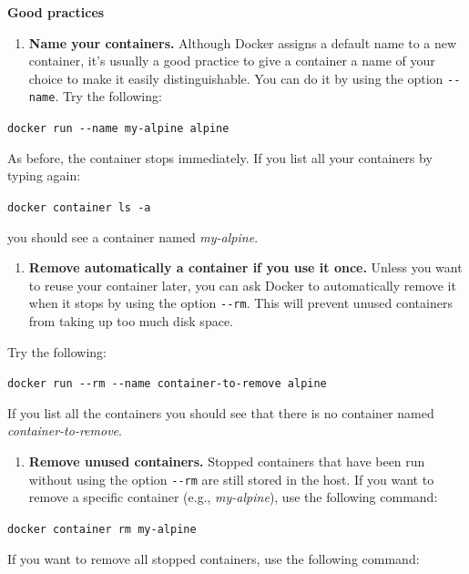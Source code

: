 \documentclass[
]{article}
\providecommand{\tightlist}{%
  \setlength{\itemsep}{0pt}\setlength{\parskip}{0pt}}
\newenvironment{infobox}[1]
  {
  \begin{itemize}
  \renewcommand{\labelitemi}{
    \raisebox{-.7\height}[0pt][0pt]{
      
    }
  }
  \setlength{\fboxsep}{1em}
  \begin{whitebox}
  \item
  }
  {
  \end{whitebox}
  \end{itemize}
  }
\theoremstyle{definition}
\theoremstyle{definition}
\theoremstyle{definition}
\theoremstyle{remark}
\begin{document}
\begin{infobox}{curiosity}

\textbf{Good practices}

\begin{enumerate}
\def\labelenumi{\arabic{enumi}.}
\tightlist
\item
  \textbf{Name your containers.} Although Docker assigns a default name to a new container,
  it's usually a good practice to give a container a name of your
  choice to make it easily distinguishable. You can do it by using the option
  \texttt{-\/-name}. Try the following:
\end{enumerate}

\texttt{docker\ run\ -\/-name\ my-alpine\ alpine}

As before, the container stops immediately.
If you list all your containers by typing again:

\texttt{docker\ container\ ls\ -a}

you should see a container named \emph{my-alpine}.

\begin{enumerate}
\def\labelenumi{\arabic{enumi}.}
\setcounter{enumi}{1}
\tightlist
\item
  \textbf{Remove automatically a container if you use it once.}
  Unless you want to reuse your container later, you can ask Docker to automatically remove it
  when it stops by using the option \texttt{-\/-rm}.
  This will prevent unused containers from taking up too much disk space.
\end{enumerate}

Try the following:

\texttt{docker\ run\ -\/-rm\ -\/-name\ container-to-remove\ alpine}

If you list all the containers you should see that there is no container
named \emph{container-to-remove}.

\begin{enumerate}
\def\labelenumi{\arabic{enumi}.}
\setcounter{enumi}{2}
\tightlist
\item
  \textbf{Remove unused containers.} Stopped containers that have been run without
  using the option \texttt{-\/-rm} are still stored in the host.
  If you want to remove a specific
  container (e.g., \emph{my-alpine}), use the following command:
\end{enumerate}

\texttt{docker\ container\ rm\ my-alpine}

If you want to remove all stopped containers, use the
following command:


\end{infobox}
\end{document}
